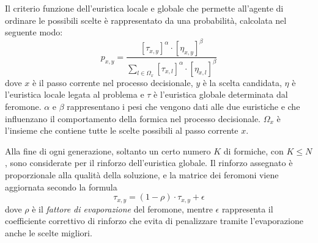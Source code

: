 Il criterio funzione dell'euristica locale e globale che permette all'agente di ordinare le possibili scelte
\`e rappresentato da una probabilit\`a, calcolata nel seguente modo:
\begin{equation}
 p_{x,y} = \frac{[\tau_{x,y}]^{\alpha}\cdot[\eta_{x,y}]^{\beta}}{\sum_{l \in 
\Omega_{x}}[\tau_{x,l}]^{\alpha}\cdot[\eta_{x,l}]^{\beta}}
\end{equation}
dove $x$ è il passo corrente nel processo decisionale, $y$ è la scelta candidata,
$\eta$ è l'euristica locale legata al problema e 
$\tau$ è l'euristica globale determinata dal feromone. $\alpha$ e $\beta$ 
rappresentano i pesi che vengono dati alle due euristiche e che influenzano il 
comportamento della formica nel processo decisionale. $\Omega_x$ è l'insieme che 
contiene tutte le scelte possibili al passo corrente $x$.

Alla fine di ogni generazione,
soltanto un certo numero $K$ di formiche, con $K \leq N$, sono considerate per il rinforzo
dell'euristica globale. Il rinforzo assegnato \`e proporzionale alla qualit\`a della soluzione,
e la matrice dei feromoni viene aggiornata secondo la formula
\begin{equation}
 \tau_{x,y} = (1-\rho)\cdot \tau_{x,y} + \epsilon
\end{equation}
dove $\rho$ è il \emph{fattore di evaporazione} del feromone, mentre $\epsilon$ 
rappresenta il coefficiente correttivo di rinforzo che evita di penalizzare 
tramite l'evaporazione anche le scelte migliori.

